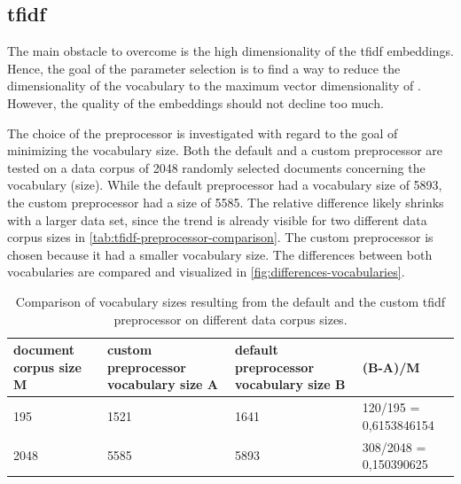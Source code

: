 \subsection*{\acs{tfidf}}\label{subsec:evaluation-tfidf}

The main obstacle to overcome is the high dimensionality of the \ac{tfidf} embeddings.
Hence, the goal of the parameter selection is to find a way to reduce the dimensionality of the vocabulary to the maximum vector dimensionality of \databaseName{}.
However, the quality of the embeddings should not decline too much.

The choice of the preprocessor is investigated with regard to the goal of minimizing the vocabulary size.
Both the default and a custom preprocessor are tested on a data corpus of 2048 randomly selected documents concerning the vocabulary (size).
While the default preprocessor had a vocabulary size of 5893, the custom preprocessor had a size of 5585.
The relative difference likely shrinks with a larger data set, 
since the trend is already visible for two different data corpus sizes in \autoref{tab:tfidf-preprocessor-comparison}.
The custom preprocessor is chosen because it had a smaller vocabulary size.
The differences between both vocabularies are compared and visualized in \autoref{fig:differences-vocabularies}.

\begin{table}[]
    \caption[Comparison of the default and the custom \ac{tfidf} preprocessor]
    {Comparison of vocabulary sizes resulting from the default and the custom \ac{tfidf} preprocessor on different data corpus sizes.}
    \begin{tabular}{|p{}|p{}|p{}|p{}|}
    \hline
    \rowcolor[HTML]{C0C0C0} 
    {\color[HTML]{000000} \textbf{document corpus size M}} & {\color[HTML]{000000} \textbf{custom preprocessor vocabulary size A}} & {\color[HTML]{000000} \textbf{default preprocessor vocabulary size B}} & {\color[HTML]{000000} \textbf{(B-A)/M}} \\ \hline
    195                                                    & 1521                                                                  & 1641                                                                   & 120/195 = 0,6153846154                  \\ \hline
    2048                                                   & 5585                                                                  & 5893                                                                   & 308/2048 = 0,150390625                  \\ \hline
    \end{tabular}
    \label{tab:tfidf-preprocessor-comparison}
\end{table}

